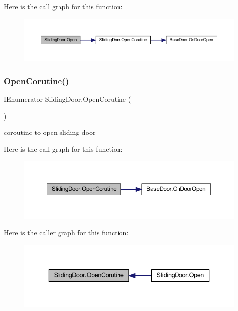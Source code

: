 Here is the call graph for this function\+:
\nopagebreak
\begin{figure}[H]
\begin{center}
\leavevmode
\includegraphics[width=350pt]{class_sliding_door_aaf090e96cc143eb5ed3eaf875045efc9_cgraph}
\end{center}
\end{figure}
\mbox{\label{class_sliding_door_adb583a66e0b4eeb5e03e50a3d4d4e109}} 
\subsubsection{\texorpdfstring{Open\+Corutine()}{OpenCorutine()}}
{\footnotesize\ttfamily I\+Enumerator Sliding\+Door.\+Open\+Corutine (\begin{DoxyParamCaption}{ }\end{DoxyParamCaption})\hspace{0.3cm}{\ttfamily [private]}}



coroutine to open sliding door 

Here is the call graph for this function\+:
\nopagebreak
\begin{figure}[H]
\begin{center}
\leavevmode
\includegraphics[width=350pt]{class_sliding_door_adb583a66e0b4eeb5e03e50a3d4d4e109_cgraph}
\end{center}
\end{figure}
Here is the caller graph for this function\+:
\nopagebreak
\begin{figure}[H]
\begin{center}
\leavevmode
\includegraphics[width=336pt]{class_sliding_door_adb583a66e0b4eeb5e03e50a3d4d4e109_icgraph}
\end{center}
\end{figure}
\mbox{\label{class_sliding_door_a259817872880d475d54ba9721a6db5cc}} 
